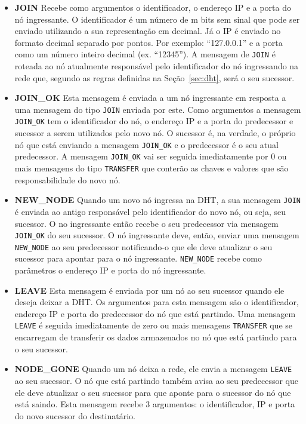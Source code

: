 \documentclass[oneside,12pt,a4paper]{article}
\begin{document}
\begin{itemize}
\item \textbf{JOIN} Recebe como argumentos o identificador, o endereço
  IP e a porta do nó ingressante. O identificador é um número de m
  bits sem sinal que pode ser enviado utilizando a sua representação
  em decimal. Já o IP é enviado no formato decimal separado por
  pontos. Por exemplo: ``127.0.0.1'' e a porta como um número inteiro
  decimal (ex. ``12345''). A mensagem de \texttt{JOIN} é roteada ao nó
  atualmente responsável pelo identificador do nó ingressando na rede
  que, segundo as regras definidas na Seção~\ref{sec:dht}, será o seu
  sucessor.

\item \textbf{JOIN\_OK} Esta mensagem é enviada a um nó ingressante em
  resposta a uma mensagem do tipo \texttt{JOIN} enviada por este.
  Como argumentos a mensagem \texttt{JOIN\_OK} tem o identificador do
  nó, o endereço IP e a porta do predecessor e sucessor a serem
  utilizados pelo novo nó. O sucessor é, na verdade, o próprio nó que
  está enviando a mensagem \texttt{JOIN\_OK} e o predecessor é o seu
  atual predecessor. A mensagem \texttt{JOIN\_OK} vai ser seguida
  imediatamente por 0 ou mais mensagens do tipo \texttt{TRANSFER} que
  conterão as chaves e valores que são responsabilidade do novo nó.

\item \textbf{NEW\_NODE} Quando um novo nó ingressa na DHT, a sua
  mensagem \texttt{JOIN} é enviada ao antigo responsável pelo
  identificador do novo nó, ou seja, seu sucessor. O no ingressante
  então recebe o seu predecessor via mensagem \texttt{JOIN\_OK} do seu
  sucessor. O nó ingressante deve, então, enviar uma mensagem
  \texttt{NEW\_NODE} ao seu predecessor notificando-o que ele deve
  atualizar o seu sucessor para apontar para o nó
  ingressante. \texttt{NEW\_NODE} recebe como parâmetros o endereço IP e
  porta do nó ingressante.

\item \textbf{LEAVE} Esta mensagem é enviada por um nó ao seu sucessor
  quando ele deseja deixar a DHT. Os argumentos para esta mensagem são
  o identificador, endereço IP e porta do predecessor do nó que está
  partindo. Uma mensagem \texttt{LEAVE} é seguida imediatamente de
  zero ou mais mensagens \texttt{TRANSFER} que se encarregam de
  transferir os dados armazenados no nó que está partindo para o seu
  sucessor.

\item \textbf{NODE\_GONE} Quando um nó deixa a rede, ele envia a
  mensagem \texttt{LEAVE} ao seu sucessor. O nó que está partindo
  também avisa ao seu predecessor que ele deve atualizar o seu
  sucessor para que aponte para o sucessor do nó que está saindo. Esta
  mensagem recebe 3 argumentos: o identificador, IP e porta do novo
  sucessor do destinatário.


\end{itemize}
\end{document}
